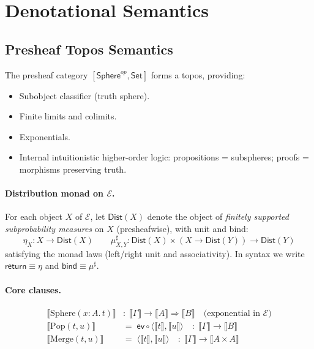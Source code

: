 \documentclass{article}
\begin{document}
\section{Denotational Semantics}\label{sec:denotational}

\subsection{Presheaf Topos Semantics}

The presheaf category $[\mathsf{Sphere}^{op}, \mathsf{Set}]$ forms a topos, providing:
\begin{itemize}
\item Subobject classifier (truth sphere).
\item Finite limits and colimits.
\item Exponentials.
\item Internal intuitionistic higher-order logic: propositions = subspheres; proofs = morphisms preserving truth.
\end{itemize}

\paragraph{Distribution monad on $\mathcal{E}$.}
For each object $X$ of $\mathcal{E}$, let $\mathsf{Dist}(X)$ denote the object of
\emph{finitely supported subprobability measures} on $X$ (presheafwise), with unit and bind:
\[
\eta_X : X \to \mathsf{Dist}(X)
\qquad
\mu^\sharp_{X,Y} : \mathsf{Dist}(X) \times (X \to \mathsf{Dist}(Y)) \to \mathsf{Dist}(Y)
\]
satisfying the monad laws (left/right unit and associativity). In syntax we write
$\mathsf{return} \equiv \eta$ and $\mathsf{bind} \equiv \mu^\sharp$.

\paragraph{Core clauses.}
\[
\begin{aligned}
\llbracket \mathrm{Sphere}(x{:}A.\,t) \rrbracket
&:\; \llbracket \Gamma \rrbracket \to \llbracket A \rrbracket \Rightarrow \llbracket B \rrbracket
\quad\text{(exponential in } \mathcal{E}\text{)} \\
\llbracket \mathrm{Pop}(t,u) \rrbracket
&=\; \mathsf{ev} \circ \langle \llbracket t \rrbracket , \llbracket u \rrbracket \rangle
\quad:\; \llbracket \Gamma \rrbracket \to \llbracket B \rrbracket \\
\llbracket \mathrm{Merge}(t,u) \rrbracket
&=\; \langle \llbracket t \rrbracket , \llbracket u \rrbracket \rangle
\quad:\; \llbracket \Gamma \rrbracket \to \llbracket A \times A \rrbracket
\end{aligned}
\]
\end{document}
